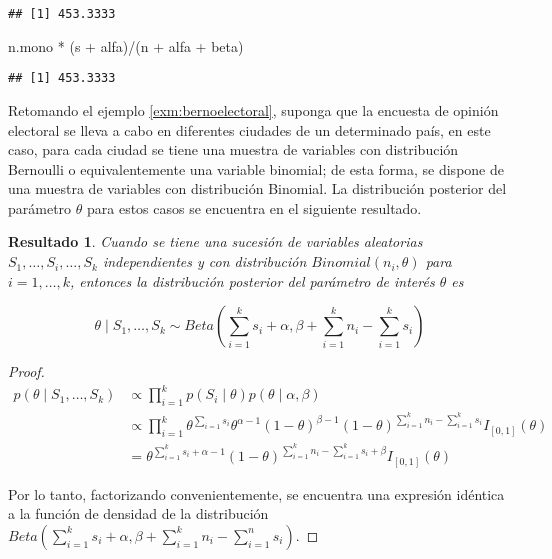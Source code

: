 \documentclass[
  10pt,
  spanish,
]{book}
\newenvironment{Shaded}{\begin{snugshade}}{\end{snugshade}}
\newcommand{\NormalTok}[1]{#1}
\newcommand{\SpecialCharTok}[1]{\textcolor[rgb]{0.00,0.00,0.00}{#1}}
\newtheorem{proposition}{Resultado}[chapter]
\theoremstyle{definition}
\theoremstyle{definition}
\theoremstyle{definition}
\theoremstyle{definition}
\theoremstyle{remark}
\begin{document}
\begin{verbatim}
## [1] 453.3333
\end{verbatim}

\begin{Shaded}
\begin{Highlighting}[]
\NormalTok{n.mono }\SpecialCharTok{*}\NormalTok{ (s }\SpecialCharTok{+}\NormalTok{ alfa)}\SpecialCharTok{/}\NormalTok{(n }\SpecialCharTok{+}\NormalTok{ alfa }\SpecialCharTok{+}\NormalTok{ beta)}
\end{Highlighting}
\end{Shaded}

\begin{verbatim}
## [1] 453.3333
\end{verbatim}

Retomando el ejemplo \ref{exm:bernoelectoral}, suponga que la encuesta de opinión electoral
se lleva a cabo en diferentes ciudades de un determinado país, en este
caso, para cada ciudad se tiene una muestra de variables con
distribución Bernoulli o equivalentemente una variable binomial; de esta
forma, se dispone de una muestra de variables con distribución Binomial.
La distribución posterior del parámetro \(\theta\) para estos casos se
encuentra en el siguiente resultado.

\begin{proposition}
\protect\hypertarget{prp:postbinom}{}{\label{prp:postbinom} }Cuando se tiene una sucesión de variables aleatorias \(S_1,\ldots,S_i, \ldots,S_k\) independientes y con distribución \(Binomial(n_i,\theta)\) para \(i=1,\ldots,k\), entonces la distribución posterior del parámetro de interés \(\theta\) es

\begin{equation*}
\theta \mid S_1,\ldots,S_k \sim Beta\left(\sum_{i=1}^ks_i+\alpha,\beta+\sum_{i=1}^k n_i-\sum_{i=1}^k s_i\right)
\end{equation*}
\end{proposition}

\begin{proof}
\iffalse{} {Prueba. } \fi{}\begin{align*}
p(\theta \mid S_1,\ldots,S_k)&\propto \prod_{i=1}^kp(S_i \mid \theta)p(\theta \mid \alpha,\beta)\\
&\propto \prod_{i=1}^k\theta^{\sum_{i=1}s_i}\theta^{\alpha-1}(1-\theta)^{\beta-1}
(1-\theta)^{\sum_{i=1}^kn_i-\sum_{i=1}^ks_i}I_{[0,1]}(\theta)\\
&= \theta^{\sum_{i=1}^ks_i+\alpha-1}(1-\theta)^{\sum_{i=1}^kn_i-\sum_{i=1}^ks_i+\beta}I_{[0,1]}(\theta)
\end{align*}

Por lo tanto, factorizando convenientemente, se encuentra una expresión idéntica a la función de densidad de la distribución \(Beta\left(\sum_{i=1}^ks_i+\alpha,\beta+\sum_{i=1}^k n_i-\sum_{i=1}^n s_i\right)\).
\end{proof}
\end{document}
